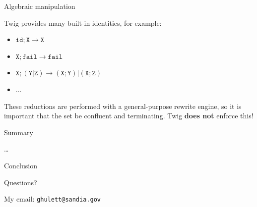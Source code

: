 \documentclass{beamer}
\begin{document}
\begin{frame}[fragile]{Algebraic manipulation}

Twig provides many built-in identities, for example:

\begin{itemize}
  \item $\mathtt{id;X} \to \mathtt{X}$
  \item $\mathtt{X;fail} \to \mathtt{fail}$
  \item $\mathtt{X;(Y|Z)} \to \mathtt{(X;Y)|(X;Z)}$
  \item $\ldots$
\end{itemize}

These reductions are performed with a general-purpose rewrite engine, so it is
important that the set be confluent and terminating. Twig \textbf{does not}
enforce this!

\end{frame}


\begin{frame}[fragile]{Summary}

\ldots

\end{frame}


\begin{frame}{Conclusion}

Questions?

My email: \texttt{ghulett@sandia.gov}

\end{frame}
\end{document}
